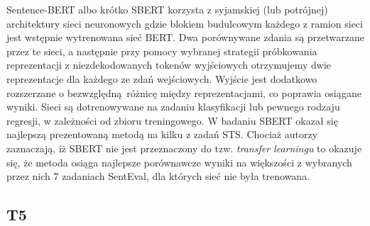 Sentence-BERT albo krótko SBERT korzysta z syjamskiej (lub potrójnej) architektury sieci neuronowych gdzie blokiem budulcowym każdego z ramion sieci jest wstępnie wytrenowana sieć BERT. Dwa porównywane zdania są przetwarzane przez te sieci, a następnie przy pomocy wybranej strategii próbkowania reprezentacji z niezdekodowanych tokenów wyjściowych otrzymujemy dwie reprezentacje dla każdego ze zdań wejściowych. Wyjście jest dodatkowo rozszerzane o bezwzględną różnicę między reprezentacjami, co poprawia osiągane wyniki. Sieci są dotrenowywane na zadaniu klasyfikacji lub pewnego rodzaju regresji, w zależności od zbioru treningowego. W badaniu SBERT okazał się najlepszą prezentowaną metodą na kilku z zadań STS. Chociaż autorzy zaznaczają, iż SBERT nie jest przeznaczony do tzw. \emph{transfer learningu} to okazuje się, że metoda osiąga najlepsze porównawcze wyniki na większości z wybranych przez nich 7 zadaniach SentEval, dla których sieć nie była trenowana.\autocite{reimers2019sentence}

\subsection{T5}

